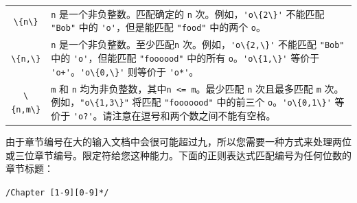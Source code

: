 \documentclass[doctor,openright,twoside]{sjtuthesis}
\newcommand{\passthrough}[1]{#1}
\theoremstyle{plain}
\theoremstyle{definition}
\theoremstyle{remark}
\theoremstyle{ocrenumbox}
\theoremstyle{plain}
\begin{document}
\begin{longtable}[]{@{}cl@{}}
\begin{minipage}[t]{0.23\columnwidth}\centering
\passthrough{\lstinline!\{n\}!}\strut
\end{minipage} & \begin{minipage}[t]{0.72\columnwidth}\raggedright
\passthrough{\lstinline!n!} 是一个非负整数。匹配确定的
\passthrough{\lstinline!n!} 次。例如，\passthrough{\lstinline!'o\{2\}'!}
不能匹配 \passthrough{\lstinline!"Bob"!} 中的
\passthrough{\lstinline!'o'!}，但是能匹配
\passthrough{\lstinline!"food"!} 中的两个
\passthrough{\lstinline!o!}。\strut
\end{minipage}\tabularnewline
\begin{minipage}[t]{0.23\columnwidth}\centering
\passthrough{\lstinline!\{n,\}!}\strut
\end{minipage} & \begin{minipage}[t]{0.72\columnwidth}\raggedright
\passthrough{\lstinline!n!}
是一个非负整数。至少匹配\passthrough{\lstinline!n!}
次。例如，\passthrough{\lstinline!'o\{2,\}'!} 不能匹配
\passthrough{\lstinline!"Bob"!} 中的
\passthrough{\lstinline!'o'!}，但能匹配
\passthrough{\lstinline!"foooood"!} 中的所有
\passthrough{\lstinline!o!}。\passthrough{\lstinline!'o\{1,\}'!} 等价于
\passthrough{\lstinline!'o+'!}。\passthrough{\lstinline!'o\{0,\}'!}
则等价于 \passthrough{\lstinline!'o*'!}。\strut
\end{minipage}\tabularnewline
\begin{minipage}[t]{0.23\columnwidth}\centering
\passthrough{\lstinline!\{n,m\}!}\strut
\end{minipage} & \begin{minipage}[t]{0.72\columnwidth}\raggedright
\passthrough{\lstinline!m!} 和 \passthrough{\lstinline!n!}
均为非负整数，其中\passthrough{\lstinline!n <= m!}。最少匹配
\passthrough{\lstinline!n!} 次且最多匹配 \passthrough{\lstinline!m!}
次。例如，\passthrough{\lstinline!"o\{1,3\}"!} 将匹配
\passthrough{\lstinline!"fooooood"!} 中的前三个
\passthrough{\lstinline!o!}。\passthrough{\lstinline!'o\{0,1\}'!} 等价于
\passthrough{\lstinline!'o?'!}。请注意在逗号和两个数之间不能有空格。\strut
\end{minipage}\tabularnewline
\bottomrule
\end{longtable}

由于章节编号在大的输入文档中会很可能超过九，所以您需要一种方式来处理两位或三位章节编号。限定符给您这种能力。下面的正则表达式匹配编号为任何位数的章节标题：

\passthrough{\lstinline!/Chapter [1-9][0-9]*/!}
\end{document}
